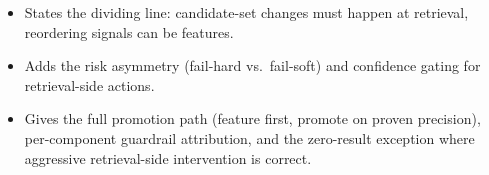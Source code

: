 \begin{interviewq}
\goodgreat
\begin{itemize}
    \item {} States the dividing line: candidate-set changes must happen at retrieval, reordering signals can be features.
    \item {} Adds the risk asymmetry (fail-hard vs.\ fail-soft) and confidence gating for retrieval-side actions.
    \item {} Gives the full promotion path (feature first, promote on proven precision), per-component guardrail attribution, and the zero-result exception where aggressive retrieval-side intervention is correct.
\end{itemize}

\end{interviewq}


